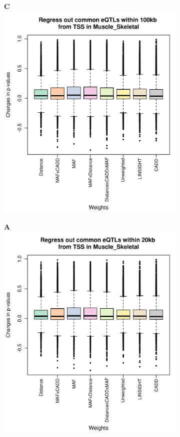 \documentclass[varwidth=20.5cm,border=4]{standalone}
\begin{document}
\begin{figure}[tb]
    \begin{subfigure}[t]{0.3\linewidth}
        \textbf{C}
        \includegraphics[width=0.9\linewidth,valign=t]{./changes.p.values.Muscle_Skeletal.100kb.pdf}
    \end{subfigure}

    \begin{subfigure}[t]{0.3\linewidth}
        \textbf{A}
        \includegraphics[width=0.9\linewidth,valign=t]{./changes.p.values.Muscle_Skeletal.20kb.pdf}
    \end{subfigure}


\end{figure}
\end{document}

